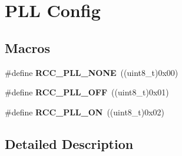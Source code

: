 \hypertarget{group___r_c_c___p_l_l___config}{}\section{P\+LL Config}
\label{group___r_c_c___p_l_l___config}
\subsection*{Macros}
\begin{DoxyCompactItemize}
\item 
\mbox{\label{group___r_c_c___p_l_l___config_gae47a612f8e15c32917ee2181362d88f3}} 
\#define {\bfseries R\+C\+C\+\_\+\+P\+L\+L\+\_\+\+N\+O\+NE}~((uint8\+\_\+t)0x00)
\item 
\mbox{\label{group___r_c_c___p_l_l___config_ga3a8d5c8bcb101c6ca1a574729acfa903}} 
\#define {\bfseries R\+C\+C\+\_\+\+P\+L\+L\+\_\+\+O\+FF}~((uint8\+\_\+t)0x01)
\item 
\mbox{\label{group___r_c_c___p_l_l___config_gaf86dbee130304ba5760818f56d34ec91}} 
\#define {\bfseries R\+C\+C\+\_\+\+P\+L\+L\+\_\+\+ON}~((uint8\+\_\+t)0x02)
\end{DoxyCompactItemize}


\subsection{Detailed Description}
